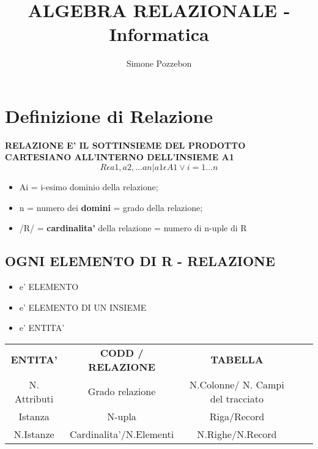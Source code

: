 \documentclass[a4paper, 12pt]{report}
\title{ALGEBRA RELAZIONALE - Informatica}
\author{Simone Pozzebon}
\date{}
\begin{document}
    \maketitle
    \tableofcontents
    \newpage
    \newpage

    \section{Definizione di Relazione}
    \begin{center}
        \textbf{RELAZIONE E' IL SOTTINSIEME DEL PRODOTTO \newline CARTESIANO ALL'INTERNO DELL'INSIEME
    A1} \newline  
        \[R \epsilon {a1, a2,...an} | a1 \epsilon A1 \vee i=1...n\] \newline
    \end{center}
    \begin{itemize}
        \item Ai = i-esimo dominio della relazione;
        \item n  = numero dei \textbf{domini} = grado della relazione;
        \item /R/ = \textbf{cardinalita'} della relazione = numero di n-uple di R
    \end{itemize}
    
    \subsection{OGNI ELEMENTO DI R - RELAZIONE}
    \begin{itemize}
        \item e' ELEMENTO
        \item e' ELEMENTO DI UN INSIEME
        \item e' ENTITA'
    \end{itemize}
    
    \begin{center}
        \begin{table}[h]
            \begin{tabular}{|c|c|c|ll}
            \cline{1-3}
            \textbf{ENTITA'} & \textbf{CODD / RELAZIONE}      & \textbf{TABELLA}                  &  &  \\ \cline{1-3}
            N. Attributi     & Grado relazione         & N.Colonne/ N. Campi del tracciato &  &  \\ \cline{1-3}
            Istanza          & N-upla                  & Riga/Record                       &  &  \\ \cline{1-3}
            N.Istanze        & Cardinalita'/N.Elementi & N.Righe/N.Record                  &  &  \\ \cline{1-3}
            \end{tabular}
            \end{table}
    \end{center}
\end{document}
